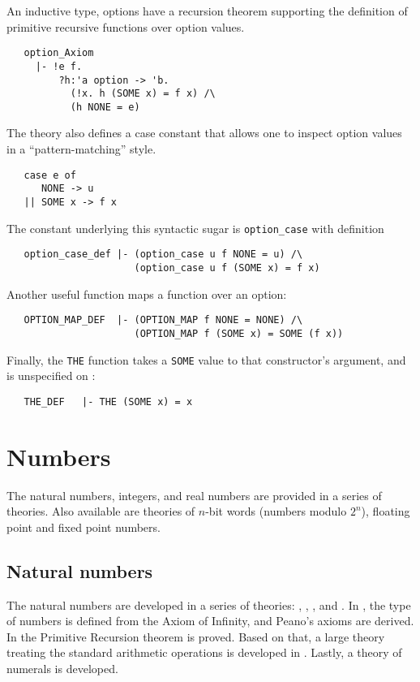 An inductive type, options have a recursion theorem supporting the
definition of primitive recursive functions over option values.
%
{\small
\begin{verbatim}
   option_Axiom
     |- !e f.
         ?h:'a option -> 'b.
           (!x. h (SOME x) = f x) /\
           (h NONE = e)
\end{verbatim}
}
The  theory also defines a case constant that allows
one to inspect option values in a ``pattern-matching'' style.
{\small
\begin{verbatim}
   case e of
      NONE -> u
   || SOME x -> f x
\end{verbatim}
}
\noindent
The constant underlying this syntactic sugar is \verb+option_case+
with definition
{\small
\begin{verbatim}
   option_case_def |- (option_case u f NONE = u) /\
                      (option_case u f (SOME x) = f x)
\end{verbatim}
}
\noindent
Another useful function maps a function over an option:
{\small
\begin{verbatim}
   OPTION_MAP_DEF  |- (OPTION_MAP f NONE = NONE) /\
                      (OPTION_MAP f (SOME x) = SOME (f x))
\end{verbatim}
}
Finally, the {\small\verb+THE+} function takes a {\small\verb+SOME+}
value to that constructor's argument, and is unspecified on
:
{\small
\begin{verbatim}
   THE_DEF   |- THE (SOME x) = x
\end{verbatim}
}

\section{Numbers}

The natural numbers, integers, and real numbers are provided in a
series of theories. Also available are theories of $n$-bit words
(numbers modulo $2^n$), floating point and fixed point numbers.

\subsection{Natural numbers}

The natural numbers are developed in a series of theories:
\theoryimp{num}, , , and
. In , the type of numbers is
defined from the Axiom of Infinity, and Peano's axioms are derived. In
\theoryimp{prim\_rec} the Primitive Recursion theorem is proved. Based
on that, a large theory treating the standard arithmetic operations is
developed in \theoryimp{arithmetic}. Lastly, a theory of numerals is
developed.

